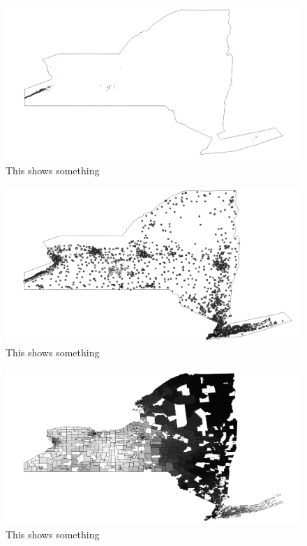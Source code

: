 \documentclass{report}
\begin{document}
\begin{figure}
\centering
\begin{framed}
\includegraphics[scale=.4]{farms_69}
\caption{This shows something}
\end{framed}
\end{figure}

\begin{figure}
\centering
\begin{framed}
\includegraphics[scale=.4]{network_69}
\caption{This shows something}
\end{framed}
\end{figure}

\begin{figure}
\centering
\begin{framed}
\includegraphics[scale=.4]{prices_69}
\caption{This shows something}
\end{framed}
\end{figure}
\end{document}
